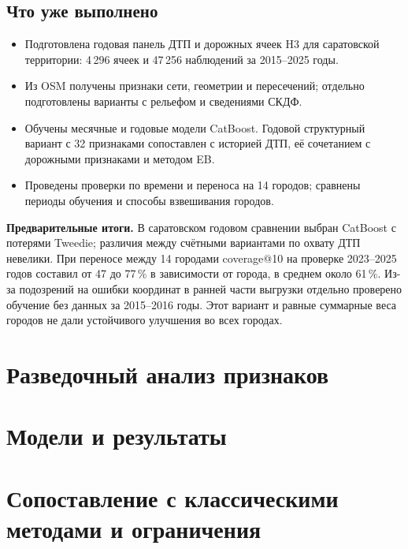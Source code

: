 \documentclass[coursework]{SCWorks}
\begin{document}
\subsection*{Что уже выполнено}

\begin{itemize}
  \item Подготовлена годовая панель ДТП и дорожных ячеек H3 для
        саратовской территории: 4\,296 ячеек и 47\,256 наблюдений
        за 2015--2025 годы.
  \item Из OSM получены признаки сети, геометрии и пересечений;
        отдельно подготовлены варианты с рельефом и сведениями СКДФ.
  \item Обучены месячные и годовые модели CatBoost. Годовой
        структурный вариант с 32 признаками сопоставлен с историей
        ДТП, её сочетанием с дорожными признаками и методом EB.
  \item Проведены проверки по времени и переноса на 14 городов;
        сравнены периоды обучения и способы взвешивания городов.
\end{itemize}

\textbf{Предварительные итоги.} В саратовском годовом сравнении
выбран CatBoost с потерями Tweedie; различия между счётными
вариантами по охвату ДТП невелики. При переносе между 14 городами
coverage@10 на проверке 2023--2025 годов составил от 47 до 77\,\%
в зависимости от города, в среднем около 61\,\%. Из-за подозрений
на ошибки координат в ранней части выгрузки отдельно проверено
обучение без данных за 2015--2016 годы. Этот вариант и равные
суммарные веса городов не дали устойчивого улучшения во всех городах.


\section{Разведочный анализ признаков}

\section{Модели и результаты}

\section{Сопоставление с классическими методами и ограничения}

\conclusion




\appendix
\end{document}
